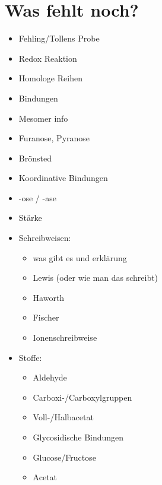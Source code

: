 
\chapter{Was fehlt noch?}
\begin{itemize}
    \item Fehling/Tollens Probe
    \item Redox Reaktion
    \item Homologe Reihen
    \item Bindungen
    \item Mesomer info
    \item Furanose, Pyranose
    \item Brönsted
    \item Koordinative Bindungen
    \item -ose / -ase
    \item Stärke

    \item Schreibweisen:
    \begin{itemize}
        \item was gibt es und erklärung
        \item Lewis (oder wie man das schreibt)
        \item Haworth
        \item Fischer
        \item Ionenschreibweise
    \end{itemize}
    \item Stoffe:
    \begin{itemize}
        \item Aldehyde
        \item Carboxi-/Carboxylgruppen
        \item Voll-/Halbacetat
        \item Glycosidische Bindungen
        \item Glucose/Fructose
        \item Acetat
    \end{itemize}
\end{itemize}

